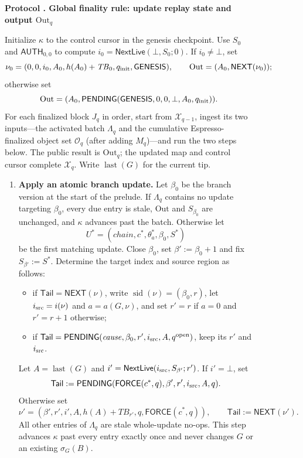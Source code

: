 \documentclass[11pt,a4paper]{article}
\newcommand{\TB}{\mathit{TB}}
\newcommand{\tagg}[1]{\ensuremath{\mathsf{#1}}}
\newcounter{protocol}
\newenvironment{protocol}[3][htbp]{\begin{figure}[#1]\refstepcounter{protocol}\label{#2}
\begin{mdframed}[linewidth=.6pt,skipabove=0pt,skipbelow=0pt,
innertopmargin=7pt,innerbottommargin=7pt]\small
\textbf{Protocol \theprotocol. #3}\par\smallskip}{\end{mdframed}\end{figure}}
\begin{document}
\begin{protocol}[H]{alg:global-rule}{Global finality rule: update replay state and output $\mathrm{Out}_q$}
Initialize $\kappa$ to the control cursor in the genesis checkpoint. Use
$S_0$ and $\tagg{AUTH}_{0,0}$ to compute
$i_0=\tagg{NextLive}(\bot,S_0;0)$.  If $i_0\ne\bot$, set
\[
 \nu_0=(0,0,i_0,A_0,h(A_0)+\TB_0,q_{\rm init},\tagg{GENESIS}),
 \qquad \mathrm{Out}=(A_0,\tagg{NEXT}(\nu_0));
\]
otherwise set
\[
 \mathrm{Out}=(A_0,
 \tagg{PENDING}(\tagg{GENESIS},0,0,\bot,A_0,q_{\rm init})).
\]
For each finalized block $J_q$ in order, start from $\mathcal X_{q-1}$,
ingest its two inputs---the activated batch $\Lambda_q$ and the cumulative
Espresso-finalized object set $\mathcal O_q$ (after adding $M_q$)---and
run the two steps below. The public result is $\mathrm{Out}_q$; the
updated map and control cursor complete $\mathcal X_q$. Write
$\operatorname{last}(G)$ for the current tip.
\begin{enumerate}[label=\textbf{\arabic*)},itemsep=3pt]
\item \textbf{Apply an atomic branch update.}
Let $\beta_0$ be the branch version at the start of the prelude.  If
$\Lambda_q$ contains no update targeting $\beta_0$, every due entry is
stale, $\mathrm{Out}$ and $S_{\beta_0}$ are unchanged, and $\kappa$
advances past the batch. Otherwise let
\[
 U^*=(\mathit{chain},c^*,\theta_a^*,\beta_0,S^*)
\]
be the first matching update.  Close $\beta_0$, set
$\beta':=\beta_0+1$ and fix $S_{\beta'}:=S^*$.  Determine the target
index and source region as follows:
  \begin{itemize}[itemsep=1pt]
  \item if $\mathsf{Tail}=\tagg{NEXT}(\nu)$, write
  $\operatorname{sid}(\nu)=(\beta_0,r)$, let $i_{\rm src}=i(\nu)$ and
  $a=a(G,\nu)$, and set $r'=r$ if $a=0$ and $r'=r+1$ otherwise;
  \item if $\mathsf{Tail}=\tagg{PENDING}
  (\mathit{cause},\beta_0,r',i_{\rm src},A,q^{\rm open})$, keep its $r'$ and
  $i_{\rm src}$.
  \end{itemize}
Let $A=\operatorname{last}(G)$ and
$i'=\tagg{NextLive}(i_{\rm src},S_{\beta'};r')$.  If $i'=\bot$, set
\[
 \mathsf{Tail}:=\tagg{PENDING}
 (\tagg{FORCE}(c^*,q),\beta',r',i_{\rm src},A,q).
\]
Otherwise set
\[
 \nu'=(\beta',r',i',A,h(A)+\TB_{r'},q,
       \tagg{FORCE}(c^*,q)),
 \qquad \mathsf{Tail}:=\tagg{NEXT}(\nu').
\]
All other entries of $\Lambda_q$ are stale whole-update no-ops.  This
step advances $\kappa$ past every entry exactly once and never changes
$G$ or an existing $\sigma_G(B)$.


\end{enumerate}
\end{protocol}
\end{document}

